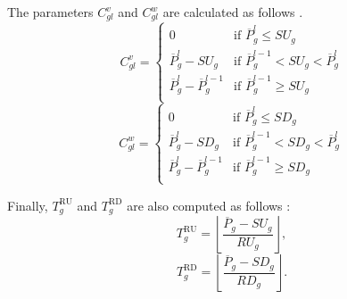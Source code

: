 The parameters $C_{gl}^{v}$ and $C_{gl}^{w}$  are calculated as follows \citep{Knueven2020b}. 
\begin{equation}
    C_{gl}^{v} =
    \left\{
     \begin{array}{ll}
       0                                           & \text{if  } \overline{P}_{g}^{l} \leq \textit{SU}_{g} \text{}\\
       \overline{P}_{g}^{l}-\textit{SU}_{g}                 & \text{if  } \overline{P}_{g}^{l-1}<\textit{SU}_{g}<\overline{P}_{g}^{l}\text{}\\
       \overline{P}_{g}^{l}-\overline{P}_{g}^{l-1} & \text{if  } \overline{P}_{g}^{l-1} \geq \textit{SU}_{g}  \text{}\\
     \end{array}
    \right.   \nonumber
\end{equation}
\begin{equation}
  C_{gl}^{w} =
    \left\{
     \begin{array}{ll}
       0                                           & \text{if  } \overline{P}_{g}^{l} \leq \textit{SD}_{g} \text{}\\
       \overline{P}_{g}^{l}-\textit{SD}_{g}                 & \text{if  } \overline{P}_{g}^{l-1}<\textit{SD}_{g}<\overline{P}_{g}^{l}\text{}\\
       \overline{P}_{g}^{l}-\overline{P}_{g}^{l-1} & \text{if  } \overline{P}_{g}^{l-1} \geq \textit{SD}_{g} \text{} \\
     \end{array}
    \right.  \nonumber
\end{equation}


Finally, $T^{\text{RU}}_{g}$ and $T^{\text{RD}}_{g}$ are also computed as follows \citep{Knueven2020b}:
\begin{equation}
T^{\text{RU}}_{g}=\left\lfloor \frac{\overline{P}_{g}-\textit{SU}_{g}}{\textit{RU}_{g}}  \right\rfloor, \nonumber
\end{equation}
\begin{equation}
T^{\text{RD}}_{g}=\left\lfloor \frac{\overline{P}_{g}-\textit{SD}_{g}}{\textit{RD}_{g}}  \right\rfloor. \nonumber
\end{equation}


